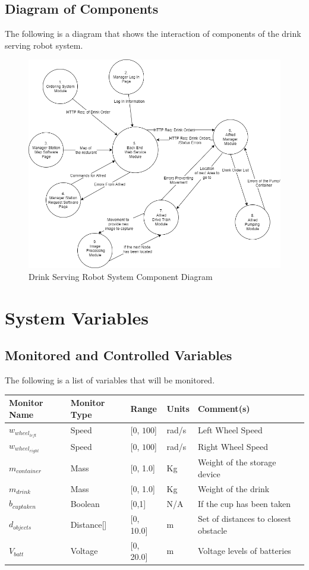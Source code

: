 \documentclass [10pt]{article}
\begin{document}
\subsection{Diagram of Components}
The following is a diagram that shows the interaction of components of the drink serving robot system.
\begin{figure} [h!]
	\centering
	\includegraphics [scale = 0.6] {Figures/SystemComponents.png}
	\caption{Drink Serving Robot System Component Diagram}
\end{figure}
\section{System Variables}

\subsection{Monitored and Controlled Variables}
The following is a list of variables that will be monitored.

\begin{longtable}{|l|l|l|l|l|}\hline 
	\rowcolor{tableCell}Monitor Name & Monitor Type & Range & Units & Comment(s) \\ \hline
	$ w_{wheel_{left}} $ & Speed & [0, $ 100 $]& rad/s &  Left Wheel Speed\\ \hline
	$ w_{wheel_{right}} $ & Speed & [0, $ 100 $]& rad/s & Right Wheel Speed \\ \hline
	$ m_{container} $ & Mass & [0, 1.0]& Kg &  Weight of the storage device  \\ \hline
	$ m_{drink} $    & Mass & [0, 1.0] & Kg &  Weight of the drink  \\ \hline
	$ b_{cuptaken } $ & Boolean & [0,1] & N/A & If the cup has been taken \\ \hline
	$  d_{objects} $ & Distance[] & [0, 10.0]& m & Set of distances to closest obstacle \\ \hline
	$  V_{batt} $ & Voltage & [0, 20.0]& m &  Voltage levels of batteries \\ \hline
\end{longtable}
\end{document}
